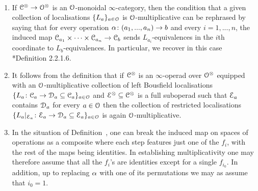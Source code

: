 \begin{remarks}\
\label{remark:full-suboperad}%
\begin{enumerate}
\item If $\mathcal C^{\otimes} \to \mathcal{O}^{\otimes}$ is an $\mathcal{O}$-monoidal $\infty$-category, 
then the condition that a given collection of localisations $\{L_a\}_{a \in \mathcal{O}}$ is $\mathcal{O}$-multiplicative can be rephrased by saying that for every operation $\alpha\colon (a_1,...,a_n) \to b$ and every $i = 1,...,n$, the induced map $\mathcal C_{a_1} \times \dots \times \mathcal C_{a_n} \to \mathcal C_{b}$ sends $L_{a_i}$-equivalences in the $i$th coordinate to $L_{b}$-equivalences. In particular, we recover in this case \cite{HA}*{Definition 2.2.1.6}.
\item
\label{item:full-suboperad}%
It follows from the definition that if $\mathcal C^{\otimes}$ is an $\infty$-operad over $\mathcal{O}^{\otimes}$ equipped with an $\mathcal{O}$-multiplicative collection of left Bousfield localisations $\{L_a\colon \mathcal C_a \to \mathcal{D}_a \subseteq \mathcal C_a\}_{a \in \mathcal{O}}$ and $\mathcal{E}^{\otimes} \subseteq \mathcal C^{\otimes}$ is a full suboperad such that $\mathcal{E}_a$ contains $\mathcal{D}_a$ for every $a \in \mathcal{O}$ then the collection of restricted localisations $\{L_a|_{\mathcal{E}_a}\colon \mathcal{E}_a \to \mathcal{D}_a \subseteq \mathcal{E}_a\}_{a \in \mathcal{O}}$ is again $\mathcal{O}$-multiplicative.
\item
\label{item:one-at-a-time}%
In the situation of Definition~, one can break the induced map on spaces of operations as a composite where each step features just one of the $f_i$, with the rest of the maps being identities. In establishing multiplicativity one may therefore assume that all the $f_i$'s are identities except for a single $f_{i_0}$. In addition, up to replacing $\alpha$ with one of its permutations we may as assume that $i_0=1$.
\end{enumerate}
\end{remarks}






